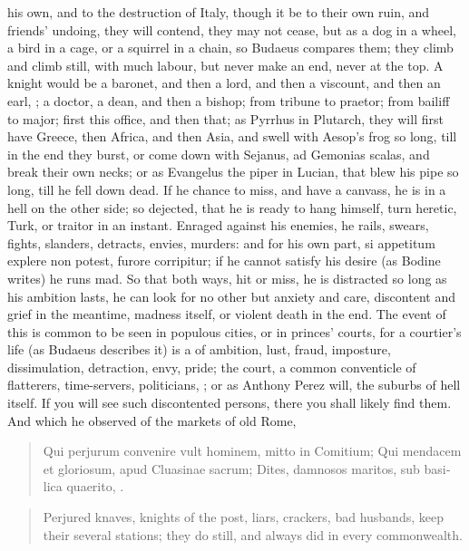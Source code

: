 {his own, and to the destruction of Italy, though it be to their own
ruin, and friends' undoing, they will contend, they may not cease, but
as a dog in a wheel, a bird in a cage, or a squirrel in a chain, so
Budaeus compares them; they climb and climb still, with
much labour, but never make an end, never at the top. A knight would be
a baronet, and then a lord, and then a viscount, and then an earl, \etc{};
a doctor, a dean, and then a bishop; from tribune to praetor; from
bailiff to major; first this office, and then that; as Pyrrhus in
Plutarch, they will first have Greece, then Africa, and then
Asia, and swell with Aesop's frog so long, till in the end they burst,
or come down with Sejanus, ad Gemonias scalas, and break their own
necks; or as Evangelus the piper in Lucian, that blew his pipe so long,
till he fell down dead. If he chance to miss, and have a canvass, he is
in a hell on the other side; so dejected, that he is ready to hang
himself, turn heretic, Turk, or traitor in an instant. Enraged against
his enemies, he rails, swears, fights, slanders, detracts, envies,
murders: and for his own part, si appetitum explere non potest, furore
corripitur; if he cannot satisfy his desire (as Bodine writes) he
runs mad. So that both ways, hit or miss, he is distracted so long as
his ambition lasts, he can look for no other but anxiety and care,
discontent and grief in the meantime, madness itself, or violent
death in the end. The event of this is common to be seen in populous
cities, or in princes' courts, for a courtier's life (as Budaeus
describes it) is a  of ambition, lust, fraud,
imposture, dissimulation, detraction, envy, pride; the court, a
common conventicle of flatterers, time-servers, politicians, \etc{}; or as
 Anthony Perez will, the suburbs of hell itself. If you will see
such discontented persons, there you shall likely find them. And
which he observed of the markets of old Rome,
%
\begin{latin}
\begin{quote}
Qui perjurum convenire vult hominem, mitto in Comitium;
Qui mendacem et gloriosum, apud Cluasinae sacrum;
Dites, damnosos maritos, sub basilica quaerito, \etc{}.
\end{quote}
\end{latin}
\translationrule
\begin{quote}
Perjured knaves, knights of the post, liars, crackers, bad husbands,
\etc{} keep their several stations; they do still, and always did in every
commonwealth.
\end{quote}

}
